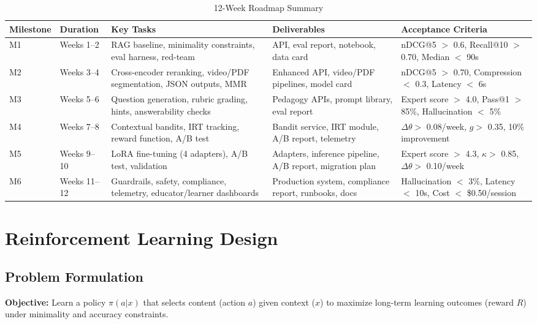 \documentclass[11pt,letterpaper]{article}
\begin{document}
\begin{table}[H]
\centering
\tiny
\begin{tabular}{@{}p{1.5cm}p{2.5cm}p{4cm}p{3.5cm}p{2.5cm}@{}}
\toprule
\textbf{Milestone} & \textbf{Duration} & \textbf{Key Tasks} & \textbf{Deliverables} & \textbf{Acceptance Criteria} \\
\midrule
M1 & Weeks 1--2 & RAG baseline, minimality constraints, eval harness, red-team & API, eval report, notebook, data card & nDCG@5 $>$ 0.6, Recall@10 $>$ 0.70, Median $<$ 90s \\
M2 & Weeks 3--4 & Cross-encoder reranking, video/PDF segmentation, JSON outputs, MMR & Enhanced API, video/PDF pipelines, model card & nDCG@5 $>$ 0.70, Compression $<$ 0.3, Latency $<$ 6s \\
M3 & Weeks 5--6 & Question generation, rubric grading, hints, answerability checks & Pedagogy APIs, prompt library, eval report & Expert score $>$ 4.0, Pass@1 $>$ 85\%, Hallucination $<$ 5\% \\
M4 & Weeks 7--8 & Contextual bandits, IRT tracking, reward function, A/B test & Bandit service, IRT module, A/B report, telemetry & $\Delta\theta >$ 0.08/week, $g >$ 0.35, 10\% improvement \\
M5 & Weeks 9--10 & LoRA fine-tuning (4 adapters), A/B test, validation & Adapters, inference pipeline, A/B report, migration plan & Expert score $>$ 4.3, $\kappa >$ 0.85, $\Delta\theta >$ 0.10/week \\
M6 & Weeks 11--12 & Guardrails, safety, compliance, telemetry, educator/learner dashboards & Production system, compliance report, runbooks, docs & Hallucination $<$ 3\%, Latency $<$ 10s, Cost $<$ \$0.50/session \\
\bottomrule
\end{tabular}
\caption{12-Week Roadmap Summary}
\end{table}

\newpage

\section{Reinforcement Learning Design}\label{sec:rl-design}

\subsection{Problem Formulation}\label{subsec:problem-formulation}

\textbf{Objective:} Learn a policy $\pi(a|x)$ that selects content (action $a$) given context ($x$) to maximize long-term learning outcomes (reward $R$) under minimality and accuracy constraints.
\end{document}
